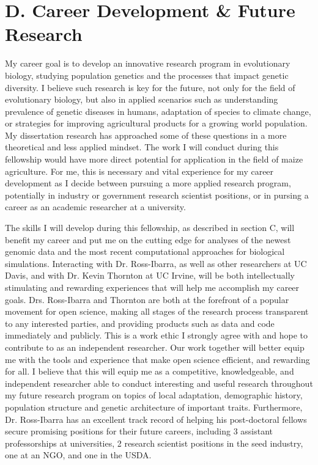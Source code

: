 \section*{D. Career Development \& Future Research}

My career goal is to develop an innovative research program in evolutionary biology, studying population genetics and the processes that impact genetic diversity. I believe such research is key for the future, not only for the field of evolutionary biology, but also in applied scenarios such as understanding prevalence of genetic diseases in humans, adaptation of species to climate change, or strategies for improving agricultural products for a growing world population. My dissertation research has approached some of these questions in a more theoretical and less applied mindset. The work I will conduct during this fellowship would have more direct potential for application in the field of maize agriculture. For me, this is necessary and vital experience for my career development as I decide between pursuing a more applied research program, potentially in industry or government research scientist positions, or in pursing a career as an academic researcher at a university.

The skills I will develop during this fellowship, as described in section C, will benefit my career and put me on the cutting edge for analyses of the newest genomic data and the most recent computational approaches for biological simulations. Interacting with Dr. Ross\--Ibarra, as well as other researchers at UC Davis, and with Dr. Kevin Thornton at UC Irvine, will be both intellectually stimulating and rewarding experiences that will help me accomplish my career goals. Drs. Ross\--Ibarra and Thornton are both at the forefront of a popular movement for open science, making all stages of the research process transparent to any interested parties, and providing products such as data and code immediately and publicly. This is a work ethic I strongly agree with and hope to contribute to as an independent researcher. Our work together will better equip me with the tools and experience that make open science efficient, and rewarding for all. I believe that this will equip me as a competitive, knowledgeable, and independent researcher able to conduct interesting and useful research throughout my future research program on topics of local adaptation, demographic history, population structure and genetic architecture of important traits. Furthermore, Dr. Ross-Ibarra has an excellent track record of helping his post-doctoral fellows secure promising positions for their future careers, including 3 assistant professorships at universities, 2 research scientist positions in the seed industry, one at an NGO, and one in the USDA. 


